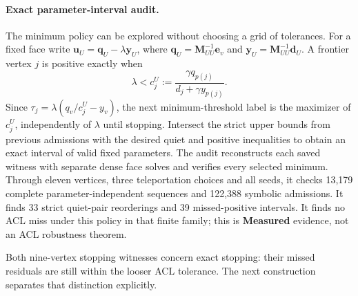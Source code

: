 \paragraph{Exact parameter-interval audit.}
The minimum policy can be explored without choosing a grid of tolerances.
For a fixed face write
$\bm u_U=\bm q_U-\lambda\bm y_U$, where
$\bm q_U=\bm M_{UU}^{-1}\bm e_v$ and
$\bm y_U=\bm M_{UU}^{-1}\bm d_U$.
A frontier vertex $j$ is positive exactly when
\[
 \lambda<c_j^U:=\frac{\gamma q_{p(j)}}{d_j+\gamma y_{p(j)}}.
\]
Since $\tau_j=\lambda(q_v/c_j^U-y_v)$, the next minimum-threshold label
is the maximizer of $c_j^U$, independently of $\lambda$ until stopping.
Intersect the strict upper bounds from previous admissions with the desired
quiet and positive inequalities to obtain an exact interval of valid fixed
parameters. The audit reconstructs each saved witness with separate dense
face solves and verifies every selected minimum.
Through eleven vertices, three teleportation choices and all seeds, it
checks 13,179 complete parameter-independent sequences and 122,388 symbolic
admissions. It finds 33 strict quiet-pair reorderings and 39 missed-positive
intervals. It finds no ACL miss under this policy in that finite family;
this is \textbf{Measured} evidence, not an ACL robustness theorem.

Both nine-vertex stopping witnesses concern exact stopping: their missed residuals are
still within the looser ACL tolerance. The next construction separates
that distinction explicitly.

